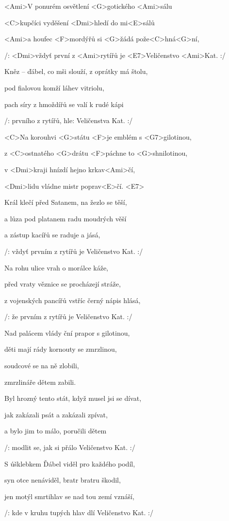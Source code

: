 


\zs
<Ami>V ponurém osvětlení <G>gotického <Ami>sálu

<C>kupčíci vyděšení <Dmi>hledí do mi<E>sálů

<Ami>a houfec <F>mordýřů si <G>žádá pože<C>hná<G>ní,

/: <Dmi>vždyť první z <Ami>rytířů je <E7>Veličenstvo <Ami>Kat. :/
\ks

\zs
Kněz -- ďábel, co mši slouží, z oprátky má štolu,

pod fialovou komží láhev vitriolu,

pach síry z hmoždířů se valí k rudé kápi

/: prvního z rytířů, hle: Veličenstva Kat. :/
\ks

\zr
<C>Na korouhvi <G>státu <F>je emblém s <G7>gilotinou,

z <C>ostnatého <G>drátu <F>páchne to <G>shnilotinou,

v <Dmi>kraji hnízdí hejno krkav<Ami>čí,

<Dmi>lidu vládne mistr poprav<E>čí. <E7>
\kr

\zs
Král klečí před Satanem, na žezlo se těší,

a lůza pod platanem radu moudrých věší

a zástup kacířů se raduje a jásá,

/: vždyť prvním z rytířů je Veličenstvo Kat. :/
\ks

\zs
Na rohu ulice vrah o morálce káže,

před vraty věznice se procházejí stráže,

z vojenských pancířů vstříc černý nápis hlásá,

/: že prvním z rytířů je Veličenstvo Kat. :/
\ks

\zr
Nad palácem vlády ční prapor s gilotinou,

děti mají rády kornouty se zmrzlinou,

soudcové se na ně zlobili,

zmrzlináře dětem zabili.
\kr

\zs
Byl hrozný tento stát, když musel jsi se dívat,

jak zakázali psát a zakázali zpívat,

a bylo jim to málo, poručili dětem

/: modlit se, jak si přálo Veličenstvo Kat. :/
\ks

\zs
S úšklebkem Ďábel viděl pro každého podíl,

syn otce nenáviděl, bratr bratru škodil,

jen motýl smrtihlav se nad tou zemí vznáší,

/: kde v kruhu tupých hlav dlí Veličenstvo Kat. :/
\ks

\kp
